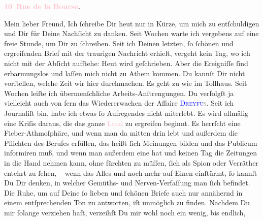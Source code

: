            \pstart
           \begin{otherlanguage}{french}\textcolor{gray}{\textbf{\textbf{\textcolor{pink}{10 Rue de la Bourse}{}\ledrightnote{\textcolor{pink}{rue de la Bourse}}.}}}\end{otherlanguage}\pend
           \pstart{}Mein lieber Freund,\pend\pstart
           Ich ſchreibe Dir heut nur in Kürze, um mich zu
                  entſchuldigen\strikeout{\textcolor{gray}{.}} und Dir für Deine Nachſicht zu danken. Seit Wochen warte ich vergebens auf
               eine freie Stunde, um \strikeout{\textcolor{gray}{×}\-\textcolor{gray}{×}\-\textcolor{gray}{×}} Dir zu  ſchreiben. Seit ich Deinen letzten, ſo ſchönen und ergreifenden Brief mit der
               traurigen Nachricht erhielt, vergeht kein Tag, wo ich nicht mit der Abſicht aufſtehe:
               Heut wird geſchrieben. Aber die Ereigniſſe ſind erbarmungslos und laſſen mich nicht
               zu Athem kommen.  Du kannſt Dir nicht vorſtellen,
               welche Zeit wir {\pb}hier durchmachen. Es geht zu wie im
               Tollhaus. Seit Wochen leiſte ich übermenſchliche Arbeits-Anſtrengungen. Du verfolgſt
               ja vielleicht auch von fern das Wiedererwachen der Affaire \textsc{\textcolor{blue}{Dreyfu\textcolor{gray}{s}}{}\ledrightnote{\textcolor{blue}{Alfred Dreyfus}}}. Seit ich Journaliſt bin, habe ich etwas ſo Aufregendes nicht miterlebt. Es
               wird allmälig eine Kriſis daraus, die das ganze \textcolor{pink}{Land}{} zu ergreifen beginnt. Es herrſcht eine Fieber-Athmoſphäre,
               und wenn man da mitten drin lebt und außerdem die Pflichten des Berufes erfüllen, das
               heißt ſich Meinungen bilden und das Publicum informiren muß, und wenn man außerdem
               eine \label{K_L02831-2v}\label{K_L02831-2h} hat und keinen Tag die Zeitungen in die Hand nehmen kann, ohne fürchten zu
               müſſen, ſich als Spion oder Verräther entehrt zu ſehen, – wenn das Alles und noch
               mehr auf Einen einſtürmt, ſo kannſt Du Dir denken, in welcher Gemüths- und
               Nerven-Verfaſſung man ſich befindet. Die Ruhe, um auf Deine ſo lieben und ſchönen
               Briefe auch nur annähernd in einem  entſprechenden
               Ton zu antworten, iſt unmöglich zu finden. Nachdem {\pb}Du mir ſolange verziehen haſt, verzeihſt Du mir wohl noch ein wenig, bis endlich,
